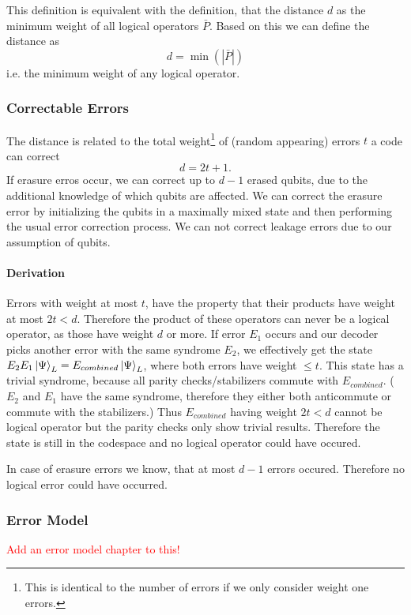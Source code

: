 This definition is equivalent with the definition, 
that the distance $d$ as the minimum weight of all logical operators $\bar{P}$. 
Based on this we can define the distance as
\begin{equation}
    d = \min( |\bar{P}| )
\end{equation}
i.e. the minimum weight of any logical operator.\cite{QECmemory}


\subsubsection{Correctable Errors}
The distance is related to the total weight\footnote{
    This is identical to the number of errors if we only consider weight one errors.
    } of (random appearing) errors $t$ a code can correct \cite{QECintro}
\begin{equation}
    d = 2t+1.
\end{equation}
If erasure erros occur, we can correct up to $d-1$ erased qubits, 
due to the additional knowledge of which qubits are affected. 
We can correct the erasure error by initializing the qubits in a maximally mixed state 
and then performing the usual error correction process.\cite{QECmemory}
We can not correct leakage errors due to our assumption of qubits.

\paragraph{Derivation}
Errors with weight at most $t$, have the property that their products have weight at most $2t<d$.
Therefore the product of these operators can never be a logical operator, as those have weight $d$ or more. 
If error $E_1$ occurs and our decoder picks another error with the same syndrome $E_2$, 
we effectively get the state $E_2 E_1 \ket{\Psi}_L = E_{combined} \ket{\Psi}_L$, where both errors have weight $\leq t$.
This state has a trivial syndrome, because all parity checks/stabilizers commute with $E_{combined}$.
($E_2$ and $E_1$ have the same syndrome, therefore they either both anticommute or commute with the stabilizers.) 
Thus $E_{combined}$ having weight $2t<d$ cannot be logical operator but the parity checks only show trivial results. 
Therefore the state is still in the codespace and no logical operator could have occured.\cite{QECmemory}

In case of erasure errors we know, that at most $d-1$ errors occured.
Therefore no logical error could have occurred. 

\subsubsection{Error Model}
\textcolor{red}{Add an error model chapter to this!}


